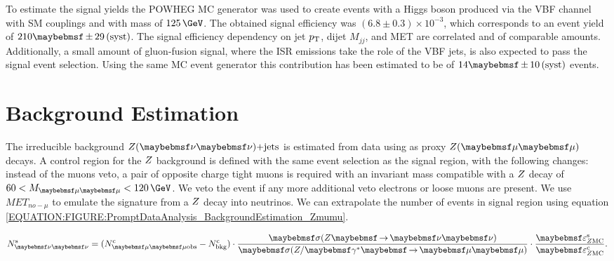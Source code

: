 To estimate the signal yields the \textsc{POWHEG} \gls{MC} generator \cite{ARTICLE:POWHEG_2004,ARTICLE:POWHEG_2007,ARTICLE:POWHEG_2009v1,ARTICLE:POWHEG_2009v2,ARTICLE:POWHEG_2010v1,ARTICLE:POWHEG_2010v2,ARTICLE:POWHEG_2011v1,ARTICLE:POWHEG_2011v2} was used to create events with a Higgs boson produced via the \gls{VBF} channel with \gls{SM} couplings and with mass of $125\,\GeV$. The obtained signal efficiency was $(6.8 \pm 0.3) \times 10^{-3}$, which corresponds to an event yield of $210 \pm 29\syst$. The signal efficiency dependency on jet $p_{\mathrm{T}}$, dijet $M_{jj}$, and \gls{MET} are correlated and of comparable amounts. Additionally, a small amount of gluon-fusion signal, where the \gls{ISR} emissions take the role of the \gls{VBF} jets, is also expected to pass the signal event selection. Using the same \gls{MC} event generator this contribution has been estimated to be of $14 \pm 10\syst$ events.

\section{Background Estimation}
\label{SECTION:PromptDataAnalysis_BackgroundEstimation}


The irreducible background $\Z(\nu \nu)\text{+jets}$ is estimated from data using as proxy $\Z (\mu \mu)$ decays. A control region for the $Z$ background is defined with the same event selection as the signal region, with the following changes: instead of the muons veto, a pair of opposite charge tight muons is required with an invariant mass compatible with a $Z$ decay of $60 < M_{\mu\mu}<120\,\GeV$. We veto the event if any more additional veto electrons or loose muons are present. We use $MET_{no-\mu}$ to emulate the signature from a $Z$ decay into neutrinos. We can extrapolate the number of events in signal region using equation \ref{EQUATION:FIGURE:PromptDataAnalysis_BackgroundEstimation_Zmumu}.

\begin{equation}
N^\mathrm{s}_{\nu\nu} = (N^\mathrm{c}_{\mu\mu\text{obs}} - N^\mathrm{c}_\text{bkg}) \cdot \frac{\sigma(\Z \to \nu\nu)}{\sigma(\Z/\gamma^{*} \to \mu\mu)} \cdot \frac{\varepsilon^\mathrm{s}_{\Z \mathrm{MC}}}{\varepsilon^\mathrm{c}_{\Z \mathrm{MC}}}.
\label{EQUATION:FIGURE:PromptDataAnalysis_BackgroundEstimation_Zmumu}
\end{equation}


